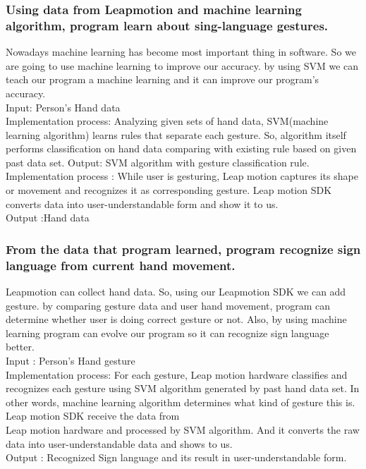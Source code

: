 \documentclass[10pt,journal,compsoc]{IEEEtran}
\begin{document}
\subsubsection{Using data from Leapmotion and machine learning algorithm, program learn about sing-language gestures.}

Nowadays machine learning has become most important thing in software. So we are going to use machine learning to improve our accuracy. by using SVM we can teach our program a machine learning and it can improve our program’s accuracy.
\\Input: Person's Hand data
\\Implementation process: Analyzing given sets of hand data, SVM(machine learning algorithm) learns rules that separate each gesture. So, algorithm itself performs classification on hand data comparing with existing rule based on given past data set.
Output: SVM algorithm with gesture classification rule.
\\Implementation process : While user is gesturing, Leap motion captures its shape or movement and recognizes it as corresponding gesture. Leap motion SDK converts data into user-understandable form and show it to us.
\\Output :Hand data
\subsubsection{From the data that program learned, program recognize sign language from current hand movement.}

Leapmotion can collect hand data. So, using our Leapmotion SDK we can add gesture. by comparing gesture data and user hand movement, program can determine whether user is doing correct gesture or not. Also, by using machine learning program can evolve our program so it can recognize sign language better.
\\Input : Person's Hand gesture
\\Implementation process: For each gesture, Leap motion hardware classifies and recognizes each gesture using SVM algorithm generated by past hand data set. In other words, machine learning algorithm determines what kind of gesture this is. Leap motion SDK receive the data from \\Leap motion hardware and processed by SVM algorithm. And it converts the raw data into user-understandable data and shows to us.
\\Output : Recognized Sign language and its result in user-understandable form.
\end{document}
